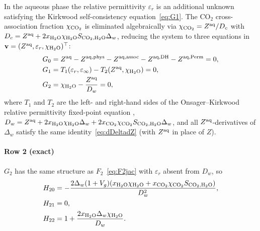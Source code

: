 \documentclass[preprint,12pt,number]{elsarticle}
\begin{document}
In the aqueous phase the relative permittivity $\varepsilon_r$ is an additional
unknown satisfying the Kirkwood self-consistency equation~\eqref{eq:G1}.
The CO$_2$ cross-association fraction $\chi_{\rm CO_2}$ is eliminated algebraically via
$\chi_{\rm CO_2} = Z^{\rm aq}/D_c$ with $D_c = Z^{\rm aq} + 2x_{\rm H_2O}\chi_{\rm H_2O} S_{{\rm CO_2},{\rm H_2O}}\Delta_w$, reducing the
system to three equations in $\mathbf{v}=(Z^{\rm aq},\varepsilon_r,\chi_{\rm H_2O})^\top$:
\begin{align}
  G_0 &= Z^{\rm aq} - Z^{{\rm aq},\text{phys}} - Z^{{\rm aq},\text{assoc}}
              - Z^{{\rm aq},\text{DH}} - Z^{{\rm aq},\text{Perm}} = 0, \label{eq:G0} \\
  G_1 &= T_1(\varepsilon_r,\varepsilon_\infty)
        - T_2(Z^{\rm aq},\chi_{\rm H_2O}) = 0, \label{eq:G1} \\
  G_2 &= \chi_{\rm H_2O} - \frac{Z^{\rm aq}}{D_w} = 0, \label{eq:G2}
\end{align}
where $T_1$ and $T_2$ are the left- and right-hand sides of the
Onsager--Kirkwood relative permittivity fixed-point equation \citep{Coelho2025},
$D_w = Z^{\rm aq} + 2x_{\rm H_2O}\chi_{\rm H_2O}\Delta_w + 2x_{\rm CO_2}\chi_{\rm CO_2} S_{{\rm CO_2},{\rm H_2O}}\Delta_w$, and all
$Z^{\rm aq}$-derivatives of $\Delta_w$ satisfy the same identity~\eqref{eq:dDeltadZ}
(with $Z^{\rm aq}$ in place of $Z$).

\paragraph{Row 2 (exact)}
$G_2$ has the same structure as $F_2$~\eqref{eq:F2jac} with $\varepsilon_r$
absent from $D_w$, so
\begin{align}
  H_{20} &= -\frac{2\Delta_w(1+V_g)(x_{\rm H_2O}\chi_{\rm H_2O} + x_{\rm CO_2}\chi_{\rm CO_2} S_{{\rm CO_2},{\rm H_2O}})}{D_w^2},
             \label{eq:H20} \\
  H_{21} &= 0, \label{eq:H21} \\
  H_{22} &= 1 + \frac{2x_{\rm H_2O}\Delta_w\chi_{\rm H_2O}}{D_w}. \label{eq:H22}
\end{align}
\end{document}
